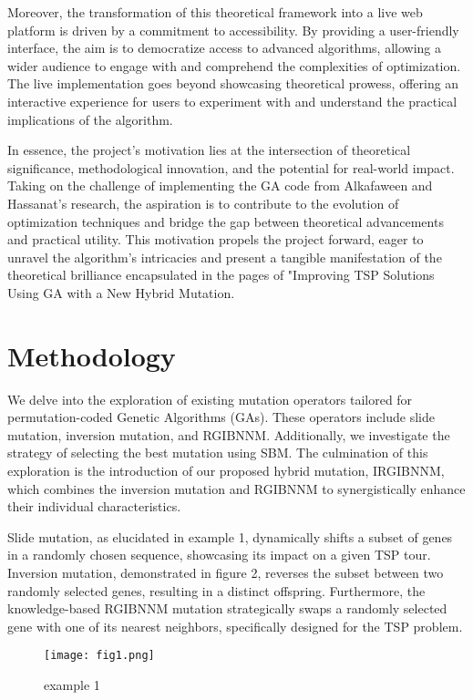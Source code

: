 \documentclass[conference]{IEEEtran}
\begin{document}
Moreover, the transformation of this theoretical framework into a live web platform is driven by a commitment to accessibility. By providing a user-friendly interface, the aim is to democratize access to advanced algorithms, allowing a wider audience to engage with and comprehend the complexities of optimization. The live implementation goes beyond showcasing theoretical prowess, offering an interactive experience for users to experiment with and understand the practical implications of the algorithm.

In essence, the project's motivation lies at the intersection of theoretical significance, methodological innovation, and the potential for real-world impact. Taking on the challenge of implementing the GA code from Alkafaween and Hassanat's research, the aspiration is to contribute to the evolution of optimization techniques and bridge the gap between theoretical advancements and practical utility. This motivation propels the project forward, eager to unravel the algorithm's intricacies and present a tangible manifestation of the theoretical brilliance encapsulated in the pages of "Improving TSP Solutions Using GA with a New Hybrid Mutation.

\section{Methodology}

We delve into the exploration of existing mutation operators tailored for permutation-coded Genetic Algorithms (GAs). These operators include slide mutation, inversion mutation, and RGIBNNM. Additionally, we investigate the strategy of selecting the best mutation using SBM. The culmination of this exploration is the introduction of our proposed hybrid mutation, IRGIBNNM, which combines the inversion mutation and RGIBNNM to synergistically enhance their individual characteristics.

Slide mutation, as elucidated in example 1, dynamically shifts a subset of genes in a randomly chosen sequence, showcasing its impact on a given TSP tour. Inversion mutation, demonstrated in figure 2, reverses the subset between two randomly selected genes, resulting in a distinct offspring. Furthermore, the knowledge-based RGIBNNM mutation strategically swaps a randomly selected gene with one of its nearest neighbors, specifically designed for the TSP problem.

\begin{figure}[t!]
\center
\texttt{[image: fig1.png]}
\caption{ example 1 }
\label{fig}
\end{figure}
\end{document}
